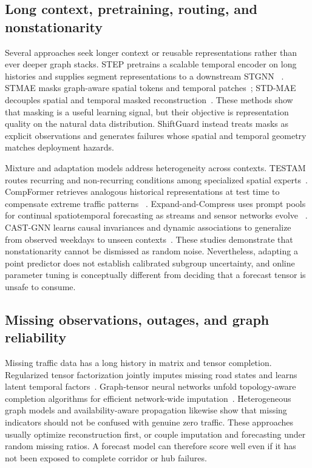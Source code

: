 \documentclass[pdflatex,sn-mathphys-num]{sn-jnl}
\begin{document}
\subsection{Long context, pretraining, routing, and nonstationarity}
Several approaches seek longer context or reusable representations rather than
ever deeper graph stacks. STEP pretrains a scalable temporal encoder on long
histories and supplies segment representations to a downstream STGNN
~\cite{shao2022step}. STMAE masks graph-aware spatial tokens and temporal
patches~\cite{sun2023stmae}; STD-MAE decouples spatial and temporal masked
reconstruction~\cite{gao2024stdmae}. These methods show that masking is a useful
learning signal, but their objective is representation quality on the natural
data distribution. ShiftGuard instead treats masks as explicit observations
and generates failures whose spatial and temporal geometry matches deployment
hazards.

Mixture and adaptation models address heterogeneity across contexts. TESTAM
routes recurring and non-recurring conditions among specialized spatial
experts~\cite{lee2024testam}. CompFormer retrieves analogous historical
representations at test time to compensate extreme traffic patterns
~\cite{zhang2023compformer}. Expand-and-Compress uses prompt pools for continual
spatiotemporal forecasting as streams and sensor networks evolve
~\cite{chen2025eac}. CAST-GNN learns causal invariances and dynamic associations
to generalize from observed weekdays to unseen contexts~\cite{wu2026cast}.
These studies demonstrate that nonstationarity cannot be dismissed as random
noise. Nevertheless, adapting a point predictor does not establish calibrated
subgroup uncertainty, and online parameter tuning is conceptually different
from deciding that a forecast tensor is unsafe to consume.

\subsection{Missing observations, outages, and graph reliability}
Missing traffic data has a long history in matrix and tensor completion.
Regularized tensor factorization jointly imputes missing road states and learns
latent temporal factors~\cite{baggag2021tensor}. Graph-tensor neural networks
unfold topology-aware completion algorithms for efficient network-wide
imputation~\cite{xu2023graphtensor}. Heterogeneous graph models and
availability-aware propagation likewise show that missing indicators should not
be confused with genuine zero traffic. These approaches usually optimize
reconstruction first, or couple imputation and forecasting under random missing
ratios. A forecast model can therefore score well even if it has not been
exposed to complete corridor or hub failures.
\end{document}
